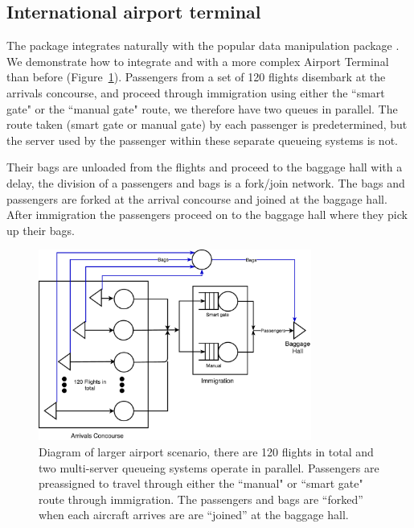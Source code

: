 \documentclass[article]{jss}
\begin{document}
\subsection{International airport terminal} \label{ssec:largerairport}

The package integrates naturally with the popular data manipulation  package  \citep{Rpkg_dplyr}. We demonstrate how to integrate  and  with a more complex Airport Terminal than before (Figure~\ref{fig:larger_airport}). Passengers from a set of 120 flights disembark at the arrivals concourse, and proceed through immigration using either the ``smart gate" or the ``manual gate" route, we therefore have two queues in parallel. The route taken (smart gate or manual gate) by each passenger is predetermined, but the server used by the passenger within these separate queueing systems is not. 

Their bags are unloaded from the flights and proceed to the baggage hall with a delay, the division of a passengers and bags is a fork/join network. The bags and passengers are forked at the arrival concourse and joined at the baggage hall. After immigration the passengers proceed on to the baggage hall where they pick up their bags. 

\begin{figure}[!htb]
\centering
\includegraphics[width = 0.8\textwidth]{figures/Larger_airport.pdf}
\caption{Diagram of larger airport scenario, there are 120 flights in total and two multi-server queueing systems operate in parallel. Passengers are preassigned to travel through either the ``manual" or ``smart gate" route through immigration. The passengers and bags are ``forked'' when each aircraft arrives are are ``joined'' at the baggage hall. }
\label{fig:larger_airport}
\end{figure}
\end{document}

